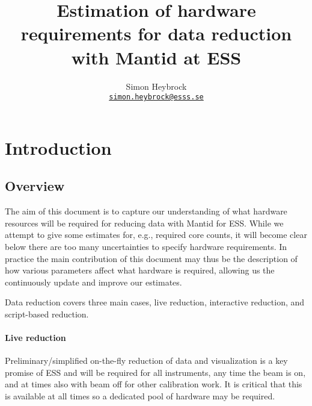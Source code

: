 \documentclass[a4paper,english,numbers=noenddot,bibliography=totoc,chapterprefix=on,DIV=12]{scrartcl}
\newcommand{\mantid}{Mantid\xspace}
\begin{document}
\title{Estimation of hardware requirements for data reduction with \mantid at ESS}
\author{Simon Heybrock\\
    {\small\href{mailto:simon.heybrock@esss.se}{\nolinkurl{simon.heybrock@esss.se}}}}

\maketitle

\tableofcontents

\section{Introduction}
\subsection{Overview}

The aim of this document is to capture our understanding of what hardware resources will be required for reducing data with \mantid for ESS.
While we attempt to give some estimates for, e.g., required core counts, it will become clear below there are too many uncertainties to specify hardware requirements.
In practice the main contribution of this document may thus be the description of how various parameters affect what hardware is required, allowing us the continuously update and improve our estimates.

Data reduction covers three main cases, live reduction, interactive reduction, and script-based reduction.

\paragraph{Live reduction}
Preliminary/simplified on-the-fly reduction of data and visualization is a key promise of ESS and will be required for all instruments, any time the beam is on, and at times also with beam off for other calibration work.
It is critical that this is available at all times so a dedicated pool of hardware may be required.
\end{document}
